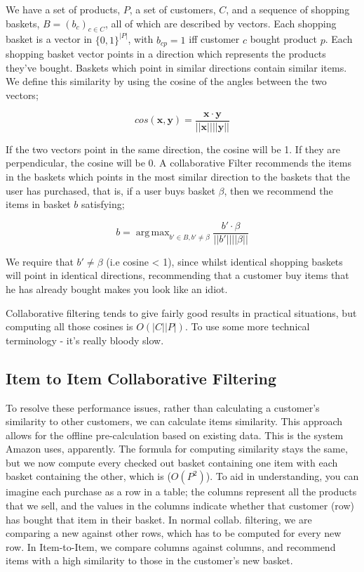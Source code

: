 \documentclass{article}
\DeclareMathOperator*{\argmax}{arg\,max}
\begin{document}
    We have a set of products, $P$, a set of customers, $C$, and a sequence of shopping baskets, $B = (b_c)_{c\in C}$, all of which are described by vectors. Each shopping basket is a vector in $\{0,1\}^{|P|}$, with $b_{cp} = 1$ iff customer $c$ bought product $p$. Each shopping basket vector points in a direction which represents the products they've bought. Baskets which point in similar directions contain similar items. We define this similarity by using the cosine of the angles between the two vectors;
    
    \begin{equation}
        cos(\mathbf{x},\mathbf{y}) = \frac{\mathbf{x}\cdot\mathbf{y}}{||\mathbf{x}|| ||\mathbf{y}||}
    \end{equation}

    If the two vectors point in the same direction, the cosine will be 1. If they are perpendicular, the cosine will be 0. A collaborative Filter recommends the items in the baskets which points in the most similar direction to the baskets that the user has purchased, that is, if a user buys basket $\beta$, then we recommend the items in basket $b$ satisfying;
    
    $$
        b = \argmax_{b' \in B, b' \neq \beta} \frac{b'\cdot\beta}{||b'|| ||\beta||}
    $$

    We require that $b' \neq \beta$ (i.e cosine < 1), since whilst identical shopping baskets will point in identical directions, recommending that a customer buy items that he has already bought makes you look like an idiot.
    
    Collaborative filtering tends to give fairly good results in practical situations, but computing all those cosines is $O(|C||P|)$. To use some more technical terminology - it's really bloody slow.
    
    \subsection{Item to Item Collaborative Filtering}
        To resolve these performance issues, rather than calculating a customer's similarity to other customers, we can calculate items similarity. This approach allows for the offline pre-calculation based on existing data. This is the system Amazon uses, apparently. The formula for computing similarity stays the same, but we now compute every checked out basket containing one item with each basket containing the other, which is ($O(P^2)$). To aid in understanding, you can imagine each purchase as a row in a table; the columns represent all the products that we sell, and the values in the columns indicate whether that customer (row) has bought that item in their basket. In normal collab. filtering, we are comparing a new against other rows, which has to be computed for every new row. In Item-to-Item, we compare columns against columns, and recommend items with a high similarity to those in the customer's new basket.        
    
\end{document}
